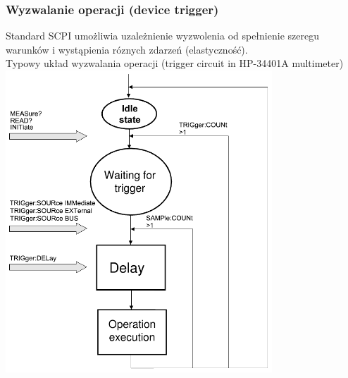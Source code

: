 \subsubsection{Wyzwalanie operacji (device trigger)}
Standard SCPI umożliwia uzależnienie wyzwolenia od spełnienie szeregu warunków i wystąpienia róznych zdarzeń (elastyczność).\\
Typowy układ wyzwalania operacji (trigger circuit in HP-34401A multimeter)\\
\includegraphics[width=10cm]{./wyklady/IEEE488_SCPI_39_1.pdf}

